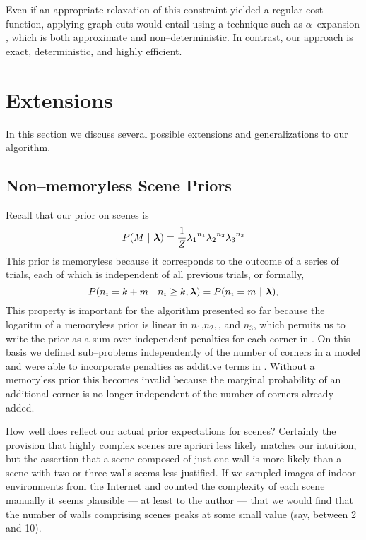 Even if an appropriate relaxation of this constraint yielded a regular
cost function, applying graph cuts would entail using a technique such
as $\alpha$--expansion \cite{Kolmogorov02}, which is both approximate
and non--deterministic. In contrast, our approach is exact,
deterministic, and highly efficient.

\section{Extensions}

In this section we discuss several possible extensions and
generalizations to our algorithm.

\subsection{Non--memoryless Scene Priors}

\newcommand\Counts{\vect{n}}
\newcommand\CategoryFunc{\omega}

Recall that our prior on scenes  is
\begin{equation}
  \label{eq:scene-prior-2}
  P(\Scene ~|~ \Penalties) = \frac{1}{Z} 
    {\PenaltyConc}^{n_1} {\PenaltyConv}^{n_2} {\PenaltyOccl}^{n_3}
\end{equation}
This prior is memoryless because it corresponds to the outcome of a
series of trials, each of which is independent of all previous trials,
or formally,
\begin{equation}
  P(n_i = k+m ~|~ n_i \geq k, \Penalties) = P(n_i = m ~|~ \Penalties),
\end{equation}
This property is important for the algorithm presented so far because
the logaritm of a memoryless prior is linear in $n_1$,$n_2,$, and
$n_3$, which permits us to write the prior as a sum over independent
penalties for each corner in . On this basis we
defined sub--problems independently of the number of corners in a
model and were able to incorporate penalties as additive terms in
. Without a memoryless prior this becomes
invalid because the marginal probability of an additional corner is no
longer independent of the number of corners already added.

How well does  reflect our actual prior
expectations for scenes? Certainly the provision that highly complex
scenes are apriori less likely matches our intuition, but the
assertion that a scene composed of just one wall is more likely than a
scene with two or three walls seems less justified. If we sampled
images of indoor environments from the Internet and counted the
complexity of each scene manually it seems plausible --- at least to
the author --- that we would find that the number of walls comprising
scenes peaks at some small value (say, between 2 and 10).

